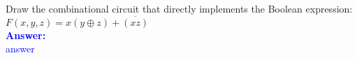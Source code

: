 \item{}
Draw the combinational circuit that directly implements the Boolean expression:\\[6pt]
$F(x,y,z)=x(y\oplus z)+\overline{(xz)}$\\[12pt]
\ifanswers
\textcolor{blue}{
\textbf{Answer:}\\
answer
}
\newpage
\fi

